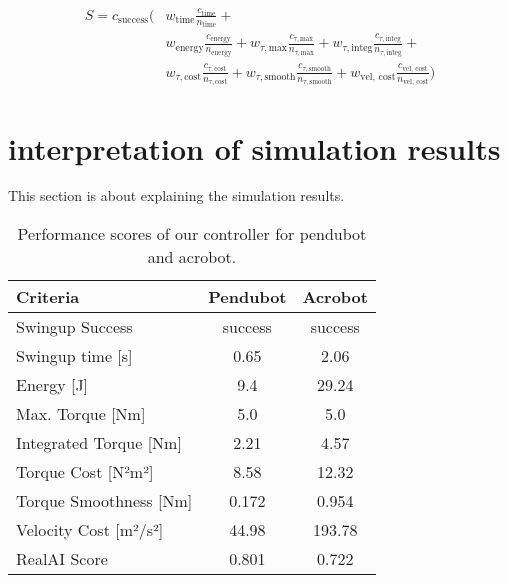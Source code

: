 \begin{equation}
\begin{aligned}
S = c_{\text{success}} \Bigg(& w_{\text{time}}\frac{c_{\text{time}}}{n_{\text{time}}} + \\
& w_{\text{energy}}\frac{c_{\text{energy}}}{n_{\text{energy}}} +
w_{\tau, \text{max}}\frac{c_{\tau, \text{max}}}{n_{\tau, \text{max}}} +
w_{\tau, \text{integ}}\frac{c_{\tau, \text{integ}}}{n_{\tau, \text{integ}}} + \\
& w_{\tau, \text{cost}}\frac{c_{\tau, \text{cost}}}{n_{\tau, \text{cost}}} +
w_{\tau, \text{smooth}}\frac{c_{\tau, \text{smooth}}}{n_{\tau, \text{smooth}}} +
w_{\text{vel, cost}}\frac{c_{\text{vel, cost}}}{n_{\text{vel, cost}}} \Bigg)
\end{aligned}
\end{equation}



\section{interpretation of simulation results}
This section is about explaining the simulation results.

\begin{table}
  \centering
 \begin{tabular}{lcc}
  Criteria& Pendubot  & Acrobot \\
 \hline
 Swingup Success& success  & success\\
 Swingup time [s]& 0.65   & 2.06\\
 Energy [J]& 9.4  & 29.24 \\
 Max. Torque [Nm]& 5.0   & 5.0 \\
 Integrated Torque [Nm]& 2.21  & 4.57 \\
 Torque Cost [N²m²] & 8.58  & 12.32 \\
 Torque Smoothness [Nm]& 0.172 & 0.954 \\
 Velocity Cost [m²/s²]& 44.98 & 193.78  \\
 RealAI Score & 0.801 & 0.722  \\
 \end{tabular}
 \caption{Performance scores of our controller for pendubot and acrobot.}
 \label{tab:performance}
\end{table}

